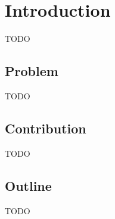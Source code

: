 \section{Introduction}

TODO \cite{hackenberg2012applying,hackenberg2012towards,hackenberg2014rapid,ascher2014early}

\subsection{Problem}

TODO

\subsection{Contribution}

TODO

\subsection{Outline}

TODO